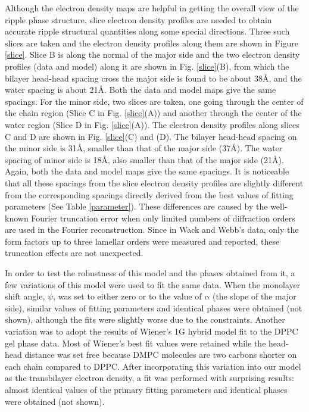 Although the electron density maps are helpful in getting the
overall view of the ripple phase structure, slice electron
density profiles are needed to obtain accurate ripple structural
quantities along some special directions. Three such slices
are taken and the electron density profiles along them are
shown in Figure \ref{slice}. Slice B is along the normal of the
major side and the two electron density profiles (data and model)
along it are shown in Fig. \ref{slice}(B), from which the bilayer
head-head spacing cross the major side is found to be about 38\AA,
and the water spacing is about 21\AA. Both the data and model maps
give the same spacings. For the minor side, two slices are taken,
one going through the center of the chain region (Slice C in
Fig. \ref{slice}(A)) and another through the center of the water
region (Slice D in Fig. \ref{slice}(A)). The electron density
profiles along slices C and D are shown in Fig. \ref{slice}(C) and
(D). The bilayer head-head spacing on the minor side is 31\AA, smaller
than that of the major side (37\AA). The water spacing of minor side
is 18\AA, also smaller than that of the major side (21\AA). Again,
both the data and model maps give the same spacings. It is noticeable
that all these spacings from the slice electron density profiles are
slightly different from the corresponding spacings directly derived from the
best values of fitting parameters (See Table \ref{parameter}). 
These differences are caused by the well-known Fourier truncation error
when only limited numbers of diffraction orders are used in the Fourier 
reconstruction. Since in Wack and Webb's data, only the form factors 
up to three lamellar orders were measured and reported, these truncation 
effects are not unexpected.

In order to test the robustness of this model and the phases obtained
from it, a few variations of this model were used to fit the same data.
When the monolayer shift angle, $\psi$, was set to either zero or
to the value of $\alpha$ (the slope of the major side), 
similar values of fitting
parameters and identical phases were obtained (not shown), although
the fits were slightly worse due to the constraints. Another variation
was to adopt the results of Wiener's \cite{MWTH} 1G hybrid model fit
to the DPPC gel phase data. Most of Wiener's best fit values were
retained while the head-head distance was set free because DMPC molecules
are two carbons shorter on each chain compared to DPPC. After incorporating
this variation into our model as the transbilayer electron density, a fit
was performed with surprising results: almost identical values of the primary
fitting parameters and identical phases were obtained (not shown). 

